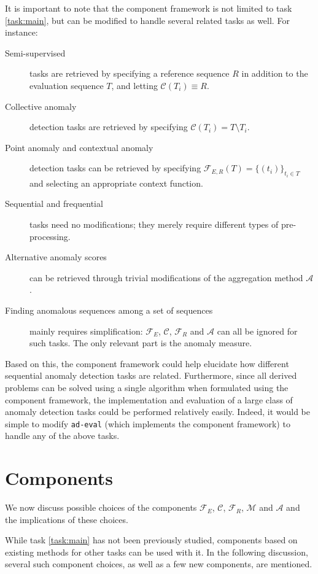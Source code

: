 It is important to note that the component framework is not limited to task \ref{task:main}, but can be modified to handle several related tasks as well. For instance:
\begin{description}
    \item[Semi-supervised] tasks are retrieved by specifying a reference sequence $R$ in addition to the evaluation sequence $T$, and letting $\mathcal{C}(T_i) \equiv R$.
    \item[Collective anomaly] detection tasks are retrieved by specifying $\mathcal{C}(T_i) = T \setminus T_i$.
    \item[Point anomaly and contextual anomaly] detection tasks can be retrieved by specifying $\mathcal{F}_{E,R}(T) = \{(t_i)\}_{t_i \in T}$ and selecting an appropriate context function.
    \item[Sequential and frequential] tasks need no modifications; they merely require different types of pre-processing.
    \item[Alternative anomaly scores] can be retrieved through trivial modifications of the aggregation method $\mathcal{A}$.
    \item[Finding anomalous sequences among a set of sequences] mainly requires simplification: $\mathcal{F}_E$, $\mathcal{C}$, $\mathcal{F}_R$ and $\mathcal{A}$ can all be ignored for such tasks. The only relevant part is the anomaly measure.
\end{description}

Based on this, the component framework could help elucidate how different sequential anomaly detection tasks are related. Furthermore, since all derived problems can be solved using a single algorithm when formulated using the component framework, the implementation and evaluation of a large class of anomaly detection tasks could be performed relatively easily. Indeed, it would be simple to modify \texttt{ad-eval} (which implements the component framework) to handle any of the above tasks.

\section{Components}
\label{sect:deriving_problems}

We now discuss possible choices of the components $\mathcal{F}_E$, $\mathcal{C}$, $\mathcal{F}_R$, $\mathcal{M}$ and $\mathcal{A}$ and the implications of these choices.

While task \ref{task:main} has not been previously studied, components based on existing methods for other tasks can be used with it. In the following discussion, several such component choices, as well as a few new components, are mentioned.

